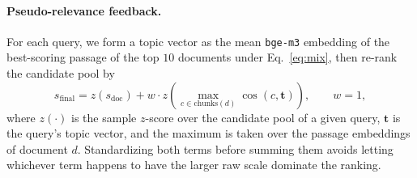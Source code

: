 \documentclass[runningheads]{llncs}
\begin{document}
\paragraph{Pseudo-relevance feedback.}
For each query, we form a topic vector as the mean \texttt{bge-m3} embedding
of the best-scoring passage of the top $10$ documents under
Eq.~\eqref{eq:mix}, then re-rank the candidate pool by
\begin{equation}
s_{\mathrm{final}} = z(s_{\mathrm{doc}}) + w \cdot z\!\left(\max_{c \in \mathrm{chunks}(d)} \cos(c, \mathbf{t})\right), \qquad w = 1,
\label{eq:prf}
\end{equation}
where $z(\cdot)$ is the sample $z$-score over the candidate pool of a given
query, $\mathbf{t}$ is the query's topic vector, and the maximum is taken
over the passage embeddings of document $d$. Standardizing both terms before
summing them avoids letting whichever term happens to have the larger raw
scale dominate the ranking.
\end{document}
